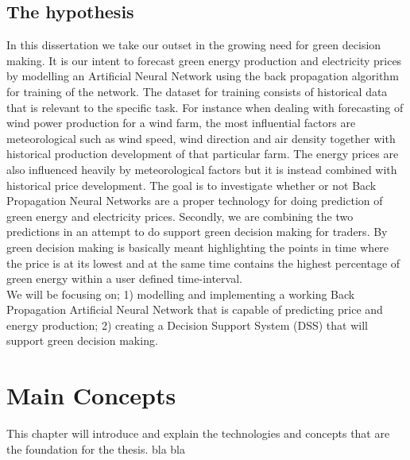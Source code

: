 \documentclass[twoside,11pt,openright]{report}
\begin{document}
\section{The hypothesis}
In this dissertation we take our outset in the growing need for green decision making. It is our intent to forecast green energy production and electricity prices by modelling an Artificial Neural Network using the back propagation algorithm for training of the network. The dataset for training consists of historical data that is relevant to the specific task. For instance when dealing with forecasting of wind power production for a wind farm, the most influential factors are meteorological such as wind speed, wind direction and air density together with historical production development of that particular farm. The energy prices are also influenced heavily by meteorological factors but it is instead combined with historical price development.
The goal is to investigate whether or not Back Propagation Neural Networks are a proper technology for doing prediction of green energy and electricity prices. Secondly, we are combining the two predictions in an attempt to do support green decision making for traders. By green decision making is basically meant highlighting the points in time where the price is at its lowest and at the same time contains the highest percentage of green energy within a user defined time-interval.
\\[0.5cm]
We will be focusing on; 1) modelling and implementing a working Back Propagation Artificial Neural Network that is capable of predicting price and energy production; 2) creating a Decision Support System (DSS) that will support green decision making.



\chapter{Main Concepts}
This chapter will introduce and explain the technologies and concepts that are the foundation for the thesis. bla bla
\label{ch:foundations}
\end{document}
